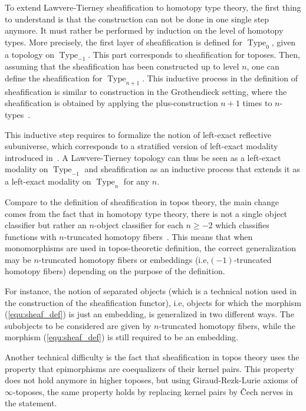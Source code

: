 \documentclass[conference]{IEEEtran}
\newcommand{\ie}{i.e,\xspace}
\DeclareMathOperator{\Type}{Type}
\begin{document}
To extend Lawvere-Tierney sheafification to homotopy type theory, the
first thing to understand is that the construction can not be done in one
single step anymore. It must rather be performed by induction on the
level of homotopy types. More precisely, the first layer of
sheafification is defined for $\Type_{0}$, given a topology on
$\Type_{-1}$. This part corresponds to sheafification for toposes. Then,
assuming that the sheafification has been constructed up to level $n$,
one can define the sheafification for $\Type_{n+1}$.
%
This inductive process in the definition of sheafification is similar
to construction in the Grothendieck setting, where the
sheafification is obtained by applying the plus-construction $n+1$
times to
$n$-types~\cite[Chapter~6]{lurie}.

This inductive step requires to formalize the notion of left-exact
reflective subuniverse, which corresponds to a stratified version of
left-exact modality introduced in~\cite[Chapter~7]{hottbook}. A
Lawvere-Tierney topology can thus be seen as a left-exact modality on
$\Type_{-1}$ and sheafification as an inductive process that extends
it as a left-exact modality on $\Type_{n}$ for any $n$.

Compare to the definition of sheafification in topos theory, the main
change comes from the fact that in homotopy type theory, there is not
a single object classifier but rather an $n$-object classifier for
each $n\geq -2$ which classifies functions with $n$-truncated homotopy
fibers~\cite{sets_in_hott}. This means that when monomorphisms are used in topos-theoretic definition, the correct generalization may be $n$-truncated homotopy
fibers or embeddings (\ie $(-1)$-truncated homotopy
fibers) depending on the purpose of the definition.

For instance, the notion of separated objects (which is a technical
notion used in the construction of the sheafification functor), \ie
objects for which the morphism
(\ref{equ:sheaf_def}) is just an embedding, is generalized in two
different ways.  
%
The subobjects to be considered are given by $n$-truncated homotopy fibers,
while the morphism (\ref{equ:sheaf_def}) is still required to be an
embedding.

Another technical difficulty is the fact that sheafification in topos
theory uses the property that epimorphisms are coequalizers of their
kernel pairs. This property does not hold anymore in higher toposes, but
using Giraud-Rezk-Lurie axioms of $\infty$-toposes, the same property
holds by replacing kernel pairs by \v{C}ech nerves in the statement.
\end{document}

